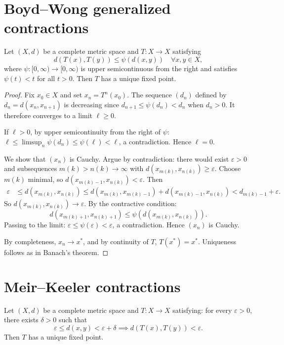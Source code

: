 \section{Boyd--Wong generalized contractions}

\begin{theorem}
Let $(X, d)$ be a complete metric space and $T : X \to X$ satisfying
\[
    d(T(x), T(y)) \leq \psi(d(x, y)) \quad \forall x, y \in X,
\]
where $\psi : [0, \infty) \to [0, \infty)$ is upper semicontinuous from the
right and satisfies $\psi(t) < t$ for all $t > 0$. Then $T$ has a unique fixed
point.
\end{theorem}

\begin{proof}
Fix $x_0 \in X$ and set $x_n = T^n(x_0)$. The sequence $(d_n)$ defined by
$d_n = d(x_n, x_{n+1})$ is decreasing since $d_{n+1} \leq \psi(d_n) < d_n$
when $d_n > 0$. It therefore converges to a limit $\ell \geq 0$.

If $\ell > 0$, by upper semicontinuity from the right of $\psi$:
$\ell \leq \limsup_{n} \psi(d_n) \leq \psi(\ell) < \ell$, a contradiction.
Hence $\ell = 0$.

We show that $(x_n)$ is Cauchy. Argue by contradiction: there would exist
$\varepsilon > 0$ and subsequences $m(k) > n(k) \to \infty$ with
$d(x_{m(k)}, x_{n(k)}) \geq \varepsilon$. Choose $m(k)$ minimal, so
$d(x_{m(k)-1}, x_{n(k)}) < \varepsilon$. Then
\begin{align*}
    \varepsilon &\leq d(x_{m(k)}, x_{n(k)})
    \leq d(x_{m(k)}, x_{m(k)-1}) + d(x_{m(k)-1}, x_{n(k)})
    < d_{m(k)-1} + \varepsilon.
\end{align*}
So $d(x_{m(k)}, x_{n(k)}) \to \varepsilon$. By the contractive condition:
\[
    d(x_{m(k)+1}, x_{n(k)+1}) \leq \psi(d(x_{m(k)}, x_{n(k)})).
\]
Passing to the limit: $\varepsilon \leq \psi(\varepsilon) < \varepsilon$, a
contradiction. Hence $(x_n)$ is Cauchy.

By completeness, $x_n \to x^*$, and by continuity of $T$, $T(x^*) = x^*$.
Uniqueness follows as in Banach's theorem.
\end{proof}

\section{Meir--Keeler contractions}

\begin{theorem}
Let $(X, d)$ be a complete metric space and $T : X \to X$ satisfying: for every
$\varepsilon > 0$, there exists $\delta > 0$ such that
\[
    \varepsilon \leq d(x, y) < \varepsilon + \delta \implies d(T(x), T(y)) < \varepsilon.
\]
Then $T$ has a unique fixed point.
\end{theorem}

